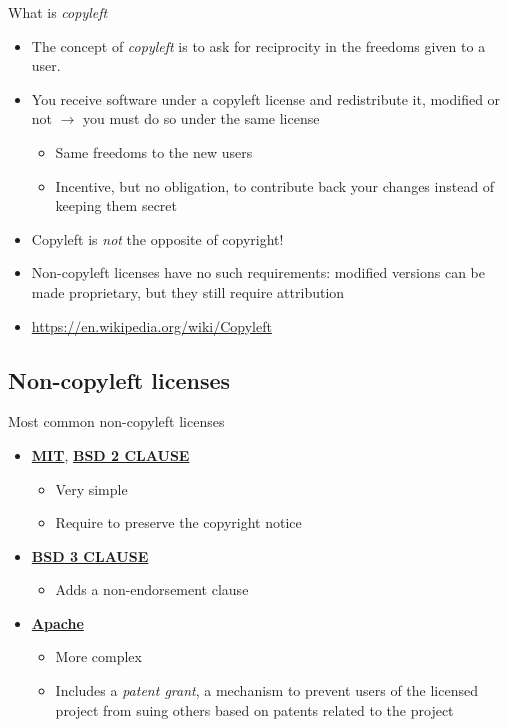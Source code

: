 \begin{frame}{What is {\em copyleft}}
  \begin{itemize}
  \item The concept of {\em copyleft} is to ask for reciprocity in the
    freedoms given to a user.
  \item You receive software under a copyleft license and
    redistribute it, modified or not $\rightarrow$ you must do so
    under the same license
    \begin{itemize}
    \item Same freedoms to the new users
    \item Incentive, but no obligation, to contribute back your
      changes instead of keeping them secret
    \end{itemize}
  \item Copyleft is {\em not} the opposite of copyright!
  \item Non-copyleft licenses have no such requirements: modified
    versions can be made proprietary, but they still require
    attribution
  \item \url{https://en.wikipedia.org/wiki/Copyleft}
  \end{itemize}
\end{frame}

\subsection{Non-copyleft licenses}

\begin{frame}{Most common non-copyleft licenses}
  \begin{itemize}
    \item {\bf \href{https://en.wikipedia.org/wiki/MIT_License}{MIT}}, {\bf
      \href{https://opensource.org/licenses/BSD-2-Clause}{BSD 2 CLAUSE}}
      \begin{itemize}
        \item Very simple
        \item Require to preserve the copyright notice
      \end{itemize}
    \item {\bf \href{https://opensource.org/licenses/BSD-3-Clause}{BSD 3
        CLAUSE}}
      \begin{itemize}
        \item Adds a non-endorsement clause
      \end{itemize}
    \item {\bf \href{https://www.apache.org/licenses/LICENSE-2.0}{Apache}}
      \begin{itemize}
        \item More complex
        \item Includes a {\em patent grant}, a mechanism to prevent users
          of the licensed project from suing others based on patents
          related to the project
      \end{itemize}
  \end{itemize}
\end{frame}

